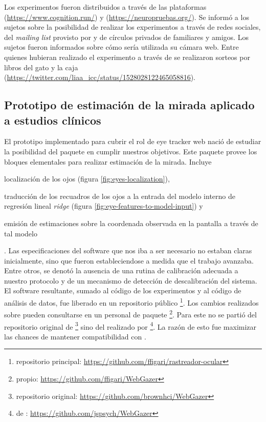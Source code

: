   Los experimentos fueron distribuidos a través de las plataformas \cognition
  (\url{https://www.cognition.run/}) y \neuropruebas
  (\url{https://neuropruebas.org/}).
  Se informó a los sujetos sobre la posibilidad de realizar los experimentos a
  través de redes sociales, del \textit{mailing list} provisto por \neuropruebas
  y de círculos privados de familiares y amigos.
  Los sujetos fueron informados sobre cómo sería utilizada su cámara web.
  Entre quienes hubieran realizado el experimento a través de \neuropruebas se 
  realizaron sorteos por libros del gato y la caja
  (\url{https://twitter.com/liaa_icc/status/1528028122465058816}).

\subsection{Prototipo de estimación de la mirada aplicado a estudios clínicos}

  El prototipo implementado para cubrir el rol de eye tracker web nació de
  estudiar la posibilidad del paquete \webgazer en cumplir nuestros objetivos.
  Este paquete provee los bloques elementales para realizar estimación de la
  mirada.
  Incluye \begin{enumerate*}
    \item localización de los ojos (figura \ref{fig:eyes-localization}),
    \item traducción de los recuadros de los ojos a la entrada del modelo
      interno de regresión lineal \textit{ridge} (figura
      \ref{fig:eye-features-to-model-input}) y
    \item emisión de estimaciones sobre la coordenada observada en la pantalla
      a través de tal modelo
  \end{enumerate*}.
  Las especificaciones del software que nos iba a ser necesario no estaban
  claras inicialmente, sino que fueron estableciendose a medida que el trabajo
  avanzaba.
  Entre otros, se denotó la ausencia de una rutina de calibración adecuada a
  nuestro protocolo y de un mecanismo de detección de descalibración del
  sistema.
  El software resultante, sumado al código de los experimentos y al código de
  análisis de datos, fue liberado en un repositorio público \footnote{
    repositorio principal:
    \url{https://github.com/ffigari/rastreador-ocular}
  }.
  Los cambios realizados sobre \webgazer pueden consultarse en un \fork
  personal de paquete \footnote{
    \fork propio:
    \url{https://github.com/ffigari/WebGazer}
  }.
  Para este \fork no se partió del repositorio original de \webgazer \footnote{
    repositorio original:
    \url{https://github.com/brownhci/WebGazer}
  } sino del \fork realizado por \jspsych \footnote{
    \fork de \jspsych:
    \url{https://github.com/jspsych/WebGazer}
  }.
  La razón de esto fue maximizar las chances de mantener compatibilidad con
  \jspsych.


